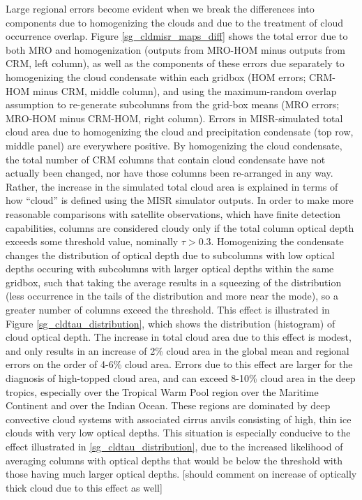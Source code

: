Large regional errors become evident when we break the differences into components due to homogenizing the clouds and due to the treatment of cloud occurrence overlap. Figure \ref{sg_cldmisr_maps_diff} shows the total error due to both MRO and homogenization (outputs from MRO-HOM minus outputs from CRM, left column), as well as the components of these errors due separately to homogenizing the cloud condensate within each gridbox (HOM errors; CRM-HOM minus CRM, middle column), and using the maximum-random overlap assumption to re-generate subcolumns from the grid-box means (MRO errors; MRO-HOM minus CRM-HOM, right column). Errors in MISR-simulated total cloud area due to homogenizing the cloud and precipitation condensate (top row, middle panel) are everywhere positive. By homogenizing the cloud condensate, the total number of CRM columns that contain cloud condensate have not actually been changed, nor have those columns been re-arranged in any way. Rather, the increase in the simulated total cloud area is explained in terms of how ``cloud'' is defined using the MISR simulator outputs. In order to make more reasonable comparisons with satellite observations, which have finite detection capabilities, columns are considered cloudy only if the total column optical depth exceeds some threshold value, nominally $\tau > 0.3$. Homogenizing the condensate changes the distribution of optical depth due to subcolumns with low optical depths occuring with subcolumns with larger optical depths within the same gridbox, such that taking the average results in a squeezing of the distribution (less occurrence in the tails of the distribution and more near the mode), so a greater number of columns exceed the threshold. This effect is illustrated in Figure \ref{sg_cldtau_distribution}, which shows the distribution (histogram) of cloud optical depth. The increase in total cloud area due to this effect is modest, and only results in an increase of 2\% cloud area in the global mean and regional errors on the order of 4-6\% cloud area. Errors due to this effect are larger for the diagnosis of high-topped cloud area, and can exceed 8-10\% cloud area in the deep tropics, especially over the Tropical Warm Pool region over the Maritime Continent and over the Indian Ocean. These regions are dominated by deep convective cloud systems with associated cirrus anvils consisting of high, thin ice clouds with very low optical depths. This situation is especially conducive to the effect illustrated in \ref{sg_cldtau_distribution}, due to the increased likelihood of averaging columns with optical depths that would be below the threshold with those having much larger optical depths. [should comment on increase of optically thick cloud due to this effect as well]

